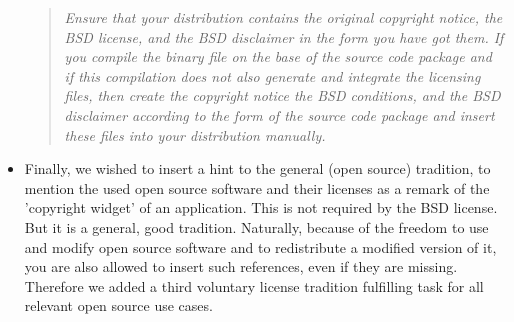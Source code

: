 \begin{itemize}
\begin{quote}\textit{Ensure that your distribution contains the original
copyright notice, the BSD license, and the BSD disclaimer in the form you have
got them. If you compile the binary file on the base of the source code package
and if this compilation does not also generate and integrate the licensing
files, then create the copyright notice the BSD conditions, and the BSD
disclaimer according to the form of the source code package and insert these
files into your distribution manually.}\end{quote}

\item Finally, we wished to insert a hint to the general (open source)
tradition, to mention the used open source software and their licenses as a
remark of the 'copyright widget' of an application. This is not required by the
BSD license. But it is a general, good tradition. Naturally, because of the
freedom to use and modify open source software and to redistribute a modified
version of it, you are also allowed to insert such references, even if they are
missing. Therefore we added a third voluntary license tradition fulfilling
task for all relevant open source use cases.

\end{itemize}




%
